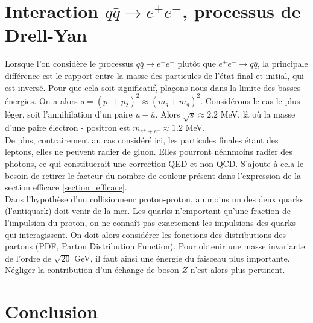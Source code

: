 \documentclass[a4paper]{article} %
\numberwithin{equation}{section} %
\theoremstyle{definition}
\theoremstyle{remark}
\theoremstyle{plain}%
\theoremstyle{style_exemple}
\begin{document}
\section{Interaction $q \bar{q}\rightarrow e^+e^-$, processus de Drell-Yan}
Lorsque l'on considère le processus $q \bar{q}\rightarrow e^+e^- $ plutôt que $e^+e^- \rightarrow  q \bar{q}$, la principale différence est le rapport entre la masse des particules de l'état final et initial, qui est inversé. Pour que cela soit significatif, plaçons nous dans la limite des basses énergies. On a alors $s = (p_1 + p_2)^2 \approx (m_q + m_{\overline{q}})^2$. Considérons le cas le plus léger, soit l'annihilation d'un paire $u-\overline{u}$. Alors $\sqrt{s} \approx 2.2 $ MeV, là où la masse d'une paire électron - positron est $m_{e^+ + e^-} \approx 1.2$ MeV.\\
De plus, contrairement au cas considéré ici, les particules finales étant des leptons, elles ne peuvent radier de gluon. Elles pourront néanmoins radier des photons, ce qui constituerait une correction QED et non QCD. S'ajoute à cela le besoin de retirer le facteur du nombre de couleur présent dans l'expression de la section efficace \eqref{section_efficace}.\\
Dans l'hypothèse d'un collisionneur proton-proton, au moins un des deux quarks (l'antiquark) doit venir de la mer. Les quarks n'emportant qu'une fraction de l'impulsion du proton, on ne connaît pas exactement les impulsions des quarks qui interagissent. On doit alors considérer les fonctions des distributions des partons (PDF, Parton Distribution Function). Pour obtenir une masse invariante de l'ordre de $\sqrt{20}$ GeV, il faut ainsi une énergie du faisceau plus importante. Négliger la contribution d'un échange de boson $Z$ n'est alors plus pertinent.

\newpage
\section{Conclusion}
\end{document}

